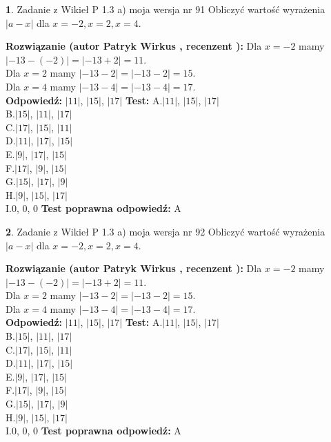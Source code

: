 \documentclass[12pt, a4paper]{article}
\theoremstyle{definition} %
\newtheorem{zad}{}
\newcommand{\zadStart}[1]{\begin{zad}#1\newline}
\newcommand{\zadStop}{\end{zad}}
\newcommand{\rozwStart}[2]{\noindent \textbf{Rozwiązanie (autor #1 , recenzent #2): }\newline}
\newcommand{\rozwStop}{\newline}
\newcommand{\odpStart}{\noindent \textbf{Odpowiedź:}\newline}
\newcommand{\odpStop}{\newline}
\newcommand{\testStart}{\noindent \textbf{Test:}\newline}
\newcommand{\testStop}{\newline}
\newcommand{\kluczStart}{\noindent \textbf{Test poprawna odpowiedź:}\newline}
\newcommand{\kluczStop}{\newline}
\begin{document}
\zadStart{Zadanie z Wikieł P 1.3 a) moja wersja nr 91}
Obliczyć wartość wyrażenia $|a - x|$ dla $x=-2,x=2,x=4$.
\zadStop
\rozwStart{Patryk Wirkus}{}
Dla $x = -2$ mamy $|-13 - (-2)| = |-13 + 2| = 11$.\\
Dla $x = 2$ mamy $|-13 - 2| = |-13 - 2| = 15$.\\
Dla $x = 4$ mamy $|-13 - 4| = |-13 - 4| = 17$.\\
\rozwStop
\odpStart
$|11|$, $|15|$, $|17|$
\odpStop
\testStart
A.$|11|$, $|15|$, $|17|$\\
B.$|15|$, $|11|$, $|17|$\\
C.$|17|$, $|15|$, $|11|$\\
D.$|11|$, $|17|$, $|15|$\\
E.$|9|$, $|17|$, $|15|$\\
F.$|17|$, $|9|$, $|15|$\\
G.$|15|$, $|17|$, $|9|$\\
H.$|9|$, $|15|$, $|17|$\\
I.$0$, $0$, $0$
\testStop
\kluczStart
A
\kluczStop



\zadStart{Zadanie z Wikieł P 1.3 a) moja wersja nr 92}
Obliczyć wartość wyrażenia $|a - x|$ dla $x=-2,x=2,x=4$.
\zadStop
\rozwStart{Patryk Wirkus}{}
Dla $x = -2$ mamy $|-13 - (-2)| = |-13 + 2| = 11$.\\
Dla $x = 2$ mamy $|-13 - 2| = |-13 - 2| = 15$.\\
Dla $x = 4$ mamy $|-13 - 4| = |-13 - 4| = 17$.\\
\rozwStop
\odpStart
$|11|$, $|15|$, $|17|$
\odpStop
\testStart
A.$|11|$, $|15|$, $|17|$\\
B.$|15|$, $|11|$, $|17|$\\
C.$|17|$, $|15|$, $|11|$\\
D.$|11|$, $|17|$, $|15|$\\
E.$|9|$, $|17|$, $|15|$\\
F.$|17|$, $|9|$, $|15|$\\
G.$|15|$, $|17|$, $|9|$\\
H.$|9|$, $|15|$, $|17|$\\
I.$0$, $0$, $0$
\testStop
\kluczStart
A
\kluczStop
\end{document}
